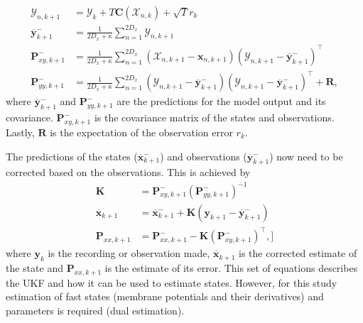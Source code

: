 \begin{align}
\mathbf{\mathcal{Y}}_{n,k+1} &= \mathbf{\mathcal{Y}}_{k} + T\mathbf{C}(\mathbf{\mathcal{X}}_{n,k})+ \sqrt{T}{r}_{k}\\
\overline{\mathbf{y}}_{k+1}^{-} &= \frac{1}{2D_{x}+\kappa}\sum_{n=1}^{2D_{x}} \mathbf{\mathcal{Y}}_{n,k+1}\\
\label{eqn: statecovg}
\mathbf{P}_{xy,k+1}^{-} &= \frac{1}{2D_{x}+\kappa}\sum_{n=1}^{2D_{x}} (\mathbf{\mathcal{X}}_{n,k+1}-\mathbf{x}_{n,k+1}) (\mathbf{\mathcal{Y}}_{n,k+1}-\overline{\mathbf{y}}_{k+1}^{-})^{\top}\\
\mathbf{P}_{yy,k+1}^{-} &= \frac{1}{2D_{x}+\kappa}\sum_{n=1}^{2D_{x}} (\mathbf{\mathcal{Y}}_{n,k+1}-\overline{\mathbf{y}}_{k+1}^{-}) (\mathbf{\mathcal{Y}}_{n,k+1}-\overline{\mathbf{y}}_{k+1}^{-})^{\top} +\mathbf{R},%
\end{align} where $\overline{\mathbf{y}}_{k+1}^{-}$ and $\mathbf{P}_{yy,k+1}^{-}$ are the predictions for the model output and its covariance. $\mathbf{P}_{xy,k+1}^{-}$ is the covariance matrix of the states and observations. Lastly, $\mathbf{R}$ is the expectation of the observation error $r_{k}$.

The predictions of the states ($\overline{\mathbf{x}}_{k+1}^{-}$) and observations ($\overline{\mathbf{y}}_{k+1}^{-}$) now need to be corrected based on the observations. This is achieved by \begin{align}
\mathbf{K} &= \mathbf{P}_{xy,k+1}^{-}(\mathbf{P}_{yy,k+1}^{-})^{-1}\\
\overline{\mathbf{x}}_{k+1} &= \overline{\mathbf{x}}_{k+1}^{-} + \mathbf{K}(\mathbf{y}_{k+1}-\overline{\mathbf{y}}_{k+1}^{-})\\
\mathbf{P}_{xx,k+1} &= \mathbf{P}_{xx,k+1}^{-} - \mathbf{K}(\mathbf{P}_{xy,k+1}^{-})^{\top},]
\end{align} where $\mathbf{y}_{k}$ is the recording or observation made, $\overline{\mathbf{x}}_{k+1}$ is the corrected estimate of the state and $\mathbf{P}_{xx,k+1}$ is the estimate of its error. This set of equations describes the UKF and how it can be used to estimate states. However, for this study estimation of fast states (membrane potentials and their derivatives) and parameters is required (dual estimation).

